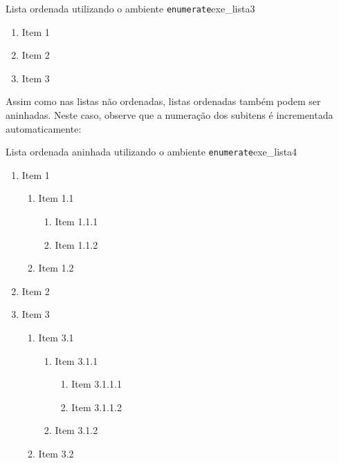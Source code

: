 \begin{texexptitled}[breakable,enhanced,middle=2mm]{Lista ordenada utilizando o ambiente \texttt{enumerate}}{exe_lista3}
\begin{enumerate}
    \item Item 1
    \item Item 2
    \item Item 3
\end{enumerate}
\end{texexptitled}

Assim como nas listas não ordenadas, listas ordenadas também podem ser aninhadas. Neste caso, observe que a numeração dos subitens é incrementada automaticamente:

\begin{texexptitled}[breakable,enhanced,middle=2mm]{Lista ordenada aninhada utilizando o ambiente \texttt{enumerate}}{exe_lista4}
\begin{enumerate}
    \item Item 1
    \begin{enumerate}
        \item Item 1.1
        \begin{enumerate}
            \item Item 1.1.1
            \item Item 1.1.2
        \end{enumerate}
        \item Item 1.2
    \end{enumerate}
    \item Item 2
    \item Item 3
    \begin{enumerate}
        \item Item 3.1
         \begin{enumerate}
            \item Item 3.1.1
            \begin{enumerate}
                \item Item 3.1.1.1
                \item Item 3.1.1.2
            \end{enumerate}
            \item Item 3.1.2
        \end{enumerate}
        \item Item 3.2
    \end{enumerate}
\end{enumerate}
\end{texexptitled}

